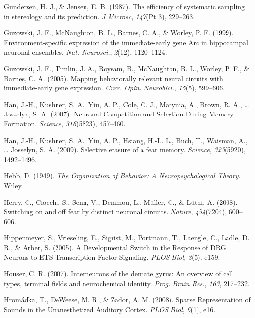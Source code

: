 \documentclass[12pt,a4paperpaper,]{report}
\begin{document}
\hypertarget{ref-gundersenux5fefficiencyux5f1987}{}
Gundersen, H. J., \& Jensen, E. B. (1987). The efficiency of systematic
sampling in stereology and its prediction. \emph{J Microsc},
\emph{147}(Pt 3), 229--263.

\hypertarget{ref-guzowskiux5fenvironment-specificux5f1999-1}{}
Guzowski, J. F., McNaughton, B. L., Barnes, C. A., \& Worley, P. F.
(1999). Environment-specific expression of the immediate-early gene Arc
in hippocampal neuronal ensembles. \emph{Nat. Neurosci.}, \emph{2}(12),
1120--1124.

\hypertarget{ref-guzowskiux5fmappingux5f2005}{}
Guzowski, J. F., Timlin, J. A., Roysam, B., McNaughton, B. L., Worley,
P. F., \& Barnes, C. A. (2005). Mapping behaviorally relevant neural
circuits with immediate-early gene expression. \emph{Curr. Opin.
Neurobiol.}, \emph{15}(5), 599--606.

\hypertarget{ref-hanux5fneuronalux5f2007}{}
Han, J.-H., Kushner, S. A., Yiu, A. P., Cole, C. J., Matynia, A., Brown,
R. A., \ldots{} Josselyn, S. A. (2007). Neuronal Competition and
Selection During Memory Formation. \emph{Science}, \emph{316}(5823),
457--460.

\hypertarget{ref-hanux5fselectiveux5f2009}{}
Han, J.-H., Kushner, S. A., Yiu, A. P., Hsiang, H.-L. L., Buch, T.,
Waisman, A., \ldots{} Josselyn, S. A. (2009). Selective erasure of a
fear memory. \emph{Science}, \emph{323}(5920), 1492--1496.

\hypertarget{ref-hebbux5forganizationux5f1949}{}
Hebb, D. (1949). \emph{The Organization of Behavior: A
Neuropsychological Theory}. Wiley.

\hypertarget{ref-herryux5fswitchingux5f2008-1}{}
Herry, C., Ciocchi, S., Senn, V., Demmou, L., Müller, C., \& Lüthi, A.
(2008). Switching on and off fear by distinct neuronal circuits.
\emph{Nature}, \emph{454}(7204), 600--606.

\hypertarget{ref-hippenmeyerux5fdevelopmentalux5f2005}{}
Hippenmeyer, S., Vrieseling, E., Sigrist, M., Portmann, T., Laengle, C.,
Ladle, D. R., \& Arber, S. (2005). A Developmental Switch in the
Response of DRG Neurons to ETS Transcription Factor Signaling.
\emph{PLOS Biol}, \emph{3}(5), e159.

\hypertarget{ref-houserux5finterneuronsux5f2007}{}
Houser, C. R. (2007). Interneurons of the dentate gyrus: An overview of
cell types, terminal fields and neurochemical identity. \emph{Prog.
Brain Res.}, \emph{163}, 217--232.

\hypertarget{ref-hromadkaux5fsparseux5f2008}{}
Hromádka, T., DeWeese, M. R., \& Zador, A. M. (2008). Sparse
Representation of Sounds in the Unanesthetized Auditory Cortex.
\emph{PLOS Biol}, \emph{6}(1), e16.
\end{document}
